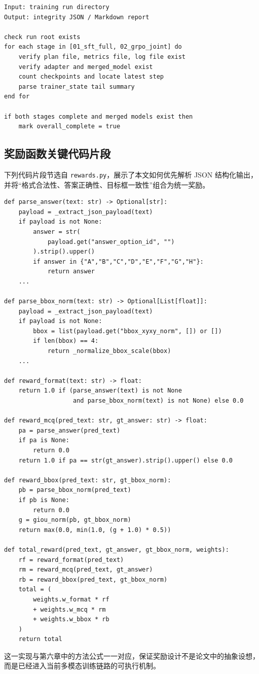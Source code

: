 \begin{thesisappendix}
\begin{verbatim}
Input: training run directory
Output: integrity JSON / Markdown report

check run root exists
for each stage in [01_sft_full, 02_grpo_joint] do
    verify plan file, metrics file, log file exist
    verify adapter and merged_model exist
    count checkpoints and locate latest step
    parse trainer_state tail summary
end for

if both stages complete and merged models exist then
    mark overall_complete = true
\end{verbatim}

\subsection{奖励函数关键代码片段}
\label{app:reward-code}

下列代码片段节选自 \texttt{rewards.py}，展示了本文如何优先解析 JSON 结构化输出，并将“格式合法性、答案正确性、目标框一致性”组合为统一奖励。

\begin{verbatim}
def parse_answer(text: str) -> Optional[str]:
    payload = _extract_json_payload(text)
    if payload is not None:
        answer = str(
            payload.get("answer_option_id", "")
        ).strip().upper()
        if answer in {"A","B","C","D","E","F","G","H"}:
            return answer
    ...

def parse_bbox_norm(text: str) -> Optional[List[float]]:
    payload = _extract_json_payload(text)
    if payload is not None:
        bbox = list(payload.get("bbox_xyxy_norm", []) or [])
        if len(bbox) == 4:
            return _normalize_bbox_scale(bbox)
    ...

def reward_format(text: str) -> float:
    return 1.0 if (parse_answer(text) is not None
                   and parse_bbox_norm(text) is not None) else 0.0

def reward_mcq(pred_text: str, gt_answer: str) -> float:
    pa = parse_answer(pred_text)
    if pa is None:
        return 0.0
    return 1.0 if pa == str(gt_answer).strip().upper() else 0.0

def reward_bbox(pred_text: str, gt_bbox_norm):
    pb = parse_bbox_norm(pred_text)
    if pb is None:
        return 0.0
    g = giou_norm(pb, gt_bbox_norm)
    return max(0.0, min(1.0, (g + 1.0) * 0.5))

def total_reward(pred_text, gt_answer, gt_bbox_norm, weights):
    rf = reward_format(pred_text)
    rm = reward_mcq(pred_text, gt_answer)
    rb = reward_bbox(pred_text, gt_bbox_norm)
    total = (
        weights.w_format * rf
        + weights.w_mcq * rm
        + weights.w_bbox * rb
    )
    return total
\end{verbatim}

这一实现与第六章中的方法公式一一对应，保证奖励设计不是论文中的抽象设想，而是已经进入当前多模态训练链路的可执行机制。
\end{thesisappendix}
